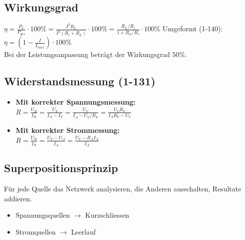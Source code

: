 \documentclass[a4paper, 6pt, landscape]{scrartcl}
\begin{document}
\begin{multicols*}{4}
	\subsection{Wirkungsgrad}
  \vspace{-0.13cm}
	$\eta=\frac{P_L}{P_{ges}}\cdot 100\%=\frac{I^2R_L}{I^2(R_i+R_L)}\cdot 100\%=\frac{R_L/R_i}{1+R_L/R_i}\cdot 100\%$
	Umgeformt (1-140): $\eta=\left(1-\frac{I}{I_{max}}\right)\cdot 100\%$\\
	Bei der Leistungsanpassung beträgt der Wirkungsgrad $50\%$.\\
	\subsection{Widerstandsmessung (1-131)}
	\begin{itemize}
		\item \textbf{Mit korrekter Spannungsmessung:}\\
		      $R=\frac{U_R}{I_R}=\frac{U_V}{I_A-I_V}=\frac{U_V}{I_A-U_V/R_V}=\frac{U_VR_V}{I_AR_V-U_V}$
		\item \textbf{Mit korrekter Strommessung:}\\
		      $R=\frac{U_R}{I_R}=\frac{U_V-U_A}{I_A}=\frac{U_V-R_AI_A}{I_A}$
	\end{itemize}

	\subsection{Superpositionsprinzip}
	Für jede Quelle das Netzwerk analysieren, die Anderen ausschalten, Resultate addieren.
	\begin{itemize}
		\item Spannungsquellen $\rightarrow$ Kurzschliessen
		\item Stromquellen $\rightarrow$ Leerlauf
	\end{itemize}



\end{multicols*}
\end{document}
